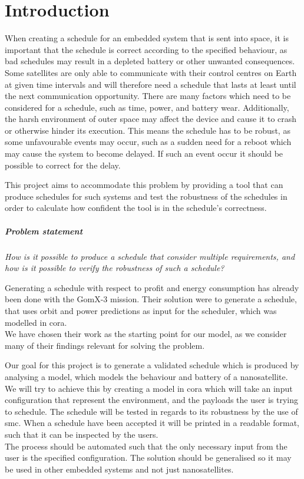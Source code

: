 \chapter{Introduction} \label{cha:intro}
When creating a schedule for an embedded system that is sent into space, it is important that the schedule is correct according to the specified behaviour, as bad schedules may result in a depleted battery or other unwanted consequences. 
Some satellites are only able to communicate with their control centres on Earth at given time intervals and will therefore need a schedule that lasts at least until the next communication opportunity.
There are many factors which need to be considered for a schedule, such as time, power, and battery wear. 
Additionally, the harsh environment of outer space may affect the device and cause it to crash or otherwise hinder its execution.
This means the schedule has to be robust, as some unfavourable events may occur, such as a sudden need for a reboot which may cause the system to become delayed. 
If such an event occur it should be possible to correct for the delay.

This project aims to accommodate this problem by providing a tool that can produce schedules for such systems and test the robustness of the schedules in order to calculate how confident the tool is in the schedule's correctness.

\paragraph{Problem statement}
\textit{How is it possible to produce a schedule that consider multiple requirements, and how is it possible to verify the robustness of such a schedule?}

Generating a schedule with respect to profit and energy consumption has already been done with the GomX-3 mission\cite{gomx3}.
Their solution were to generate a schedule, that uses orbit and power predictions as input for the scheduler, which was modelled in \gls{cora}.\\
We have chosen their work as the starting point for our model, as we consider many of their findings relevant for solving the problem.

Our goal for this project is to generate a validated schedule which is produced by analysing a model, which models the behaviour and battery of a nanosatellite.\\
We will try to achieve this by creating a model in \gls{cora} which will take an input configuration that represent the environment, and the payloads the user is trying to schedule.
The schedule will be tested in regards to its robustness by the use of \gls{smc}. %
When a schedule have been accepted it will be printed in a readable format, such that it can be inspected by the users.\\
The process should be automated such that the only necessary input from the user is the specified configuration.
The solution should be generalised so it may be used in other embedded systems and not just nanosatellites.
